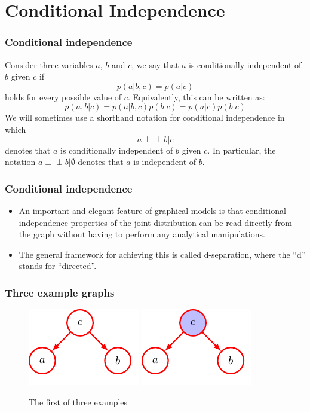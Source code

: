 \documentclass{beamer}
\newcommand{\ind}{\perp\!\!\!\!\perp}
\begin{document}
\section{Conditional Independence}

\begin{frame}
    \frametitle{Conditional independence}
    Consider three variables $a$, $b$ and $c$, we say that $a$ is conditionally independent of $b$ given $c$ if
    \begin{equation*}
        p(a|b,c)=p(a|c)
    \end{equation*}
    holds for every possible value of $c$. Equivalently, this can be written as:
    \begin{equation*}
        p(a,b|c)=p(a|b,c)p(b|c)=p(a|c)p(b|c)
    \end{equation*}
    We will sometimes use a shorthand notation for conditional independence in which
    \begin{equation*}
        a\ind{}b|c
    \end{equation*}
    denotes that $a$ is conditionally independent of $b$ given $c$. In particular, the notation $a\ind{}b|\emptyset$ denotes that $a$ is independent of $b$.
\end{frame}

\begin{frame}
    \frametitle{Conditional independence}
    \begin{itemize}
        \item An important and elegant feature of graphical models is that conditional independence properties of the joint distribution can be read directly from the graph without having to perform any analytical manipulations.
        \item The general framework for achieving this is called d-separation, where the ``d'' stands for ``directed''.
    \end{itemize}
\end{frame}

\begin{frame}
    \frametitle{Three example graphs}
    \begin{figure}
        \caption{The first of three examples}
        \includegraphics[trim=0 0 -1cm 0]{Figure_14.pdf}
        \includegraphics[trim=-1cm 0 0 0]{Figure_15.pdf}
    \end{figure}
\end{frame}
\end{document}
